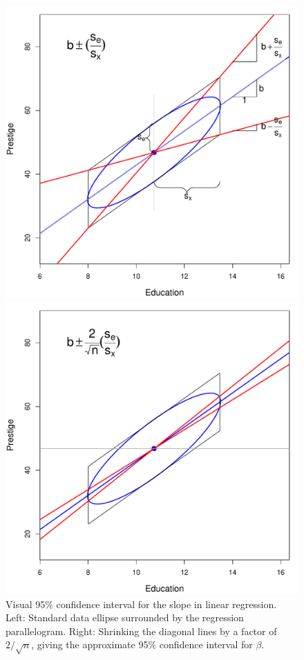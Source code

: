 \begin{figure}[htb]
  \begin{minipage}[c]{.49\textwidth}
   \includegraphics[width=1\linewidth,clip]{fig/vis-reg-prestige1}
   \end{minipage}%
  \hfill
  \begin{minipage}[c]{.49\textwidth}
   \includegraphics[width=1\linewidth,clip]{fig/vis-reg-prestige2}
  \end{minipage}
  \caption{Visual 95\% confidence interval for the slope in linear regression. Left: Standard data ellipse surrounded by the 
  regression parallelogram. Right: Shrinking the diagonal lines by a factor of $2/\sqrt{n}$,
  giving the approximate 95\% confidence interval for $\beta$.}%
  \label{vis-reg-prestige}
\end{figure}

